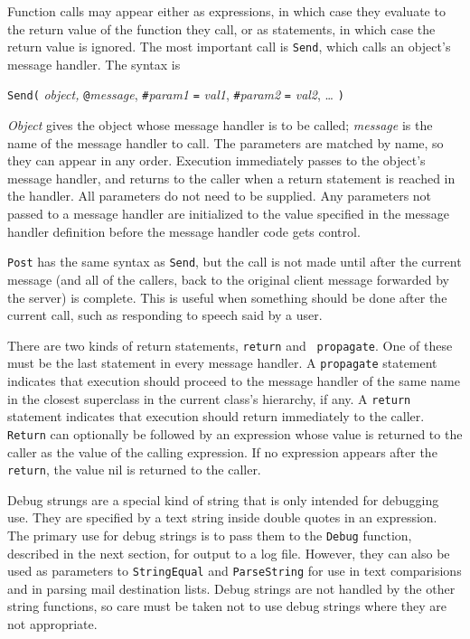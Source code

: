 Function calls may appear either as expressions, in which case they evaluate
to the return value of the function they call, or as statements, in
which case the return value is ignored.  The most important call is
{\tt Send}, which calls an object's message handler.  The syntax is
\begin{center}
{\tt Send(} {\em object, } {\tt @}{\em message}, {\tt \#}{\em param1}
{\tt =} {\em val1}, {\tt \#}{\em param2} {\tt =} {\em val2}, \ldots
{\tt )}
\end{center}
{\em Object} gives the object whose message handler is to be called;
{\em message} is the name of the message handler to call.  The
parameters are matched by name, so they can appear in any order.
Execution immediately passes to the object's message handler, and
returns to the caller when a return statement is reached in the
handler.  All parameters do not need to be supplied.  Any parameters
not passed to a message handler are initialized to the value specified
in the message handler definition before the message handler code
gets control.

\texttt{Post} has the same syntax as \texttt{Send}, but the
call is not made until after the current message (and all of the
callers, back to the original client message forwarded by the server)
is complete.  This is useful when something should be done after the
current call, such as responding to speech said by a user.

There are two kinds of return statements, {\tt return} and {\tt
propagate}.  One of these must be the last statement in every message
handler.  A {\tt propagate} statement indicates that execution should
proceed to the message handler of the same name in the closest
superclass in the current class's hierarchy, if any.  A {\tt return}
statement indicates that execution should return immediately to the
caller.  {\tt Return} can optionally be followed by an expression
whose value is returned to the caller as the value of the calling
expression.  If no expression appears after the {\tt return}, the
value nil is returned to the caller.

Debug strungs are a special kind of string that is only intended for
debugging use.  They are specified by a text string inside
double quotes in an expression.  The primary use for debug strings
is to pass them to the {\tt Debug} function, described in the next section,
for output to a log file.  However, they can also be used as parameters
to {\tt StringEqual} and {\tt ParseString} for use in text comparisions
and in parsing mail destination lists.  Debug strings are not handled
by the other string functions, so care must be taken not to use debug
strings where they are not appropriate.

